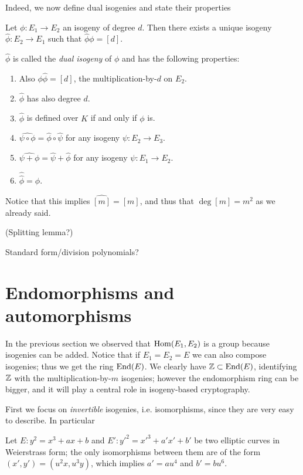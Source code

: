 Indeed, we now define dual isogenies and state their properties

\begin{theorem}
    Let $\phi:E_1\to E_2$ an isogeny of degree $d$. Then there exists a unique isogeny $\hat\phi:E_2\to E_1$ such that $\hat\phi \phi=[d]$.
    
    $\hat\phi$ is called the \emph{dual isogeny} of $\phi$ and has the following properties:
    \begin{enumerate}
        \item Also $\phi\hat\phi=[d]$, the multiplication-by-$d$ on $E_2$.
        \item $\hat\phi$ has also degree $d$.
        \item $\hat\phi$ is defined over $K$ if and only if $\phi$ is.
        \item $\widehat{\psi\circ\phi}=\hat\phi\circ\hat\psi$ for any isogeny $\psi:E_2\to E_3$.
        \item $\widehat{\psi + \phi}=\hat\psi + \hat\phi$ for any isogeny $\psi:E_1\to E_2$.
        \item $\hat{\hat\phi}=\phi$.
    \end{enumerate}
\end{theorem}

Notice that this implies $\widehat{[m]}=[m]$, and thus that $\deg[m]=m^2$ as we already said.

(Splitting lemma?)

Standard form/division polynomials?

\section{Endomorphisms and automorphisms}

In the previous section we observed that $\operatorname{Hom}(E_1, E_2)$ is a group because isogenies can be added. Notice that if $E_1=E_2=E$ we can also compose isogenies; thus we get the ring $\operatorname{End}(E)$. We clearly have $\mathbb{Z}\subset\operatorname{End}(E)$, identifying $\mathbb{Z}$ with the multiplication-by-$m$ isogenies; however the endomorphism ring can be bigger, and it will play a central role in isogeny-based cryptography.

First we focus on \emph{invertible} isogenies, i.e. isomorphisms, since they are very easy to describe. In particular
\begin{proposition}
    Let $E:y^2=x^3+ax+b$ and $E':{y'}^2={x'}^3+a'x'+b'$ be two elliptic curves in Weierstrass form; the only isomorphisms between them are of the form $(x',y')=(u^2x, u^3y)$, which implies $a'=au^4$ and $b'=bu^6$.
\end{proposition}

